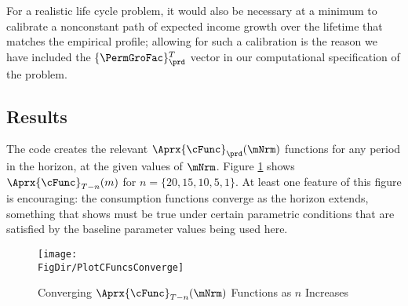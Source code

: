 \documentclass[\econtexRoot/SolvingMicroDSOPs]{subfiles}
\begin{document}
For a realistic life cycle problem, it would also be necessary at a
minimum to calibrate a nonconstant path of expected income growth over the
lifetime that matches the empirical profile; allowing for such
a calibration is the reason we have included the $\{\PermGroFac\}_{\prd}^{T}$
vector in our computational specification of the problem.

\hypertarget{results}{}
\subsection{Results}

The code creates the relevant $\Aprx{\cFunc}_{\prd}(\mNrm)$ functions for any period in the horizon, at the given values of $\mNrm$.  Figure \ref{fig:PlotCFuncsConverge} shows $\Aprx{\cFunc}_{T-n}(m)$ for $n=\{20,15,10,5,1\}$.  At least one feature of this figure is encouraging: the consumption functions converge as the horizon extends, something that \cite{BufferStockTheory} shows must be true under certain parametric conditions that are satisfied by the baseline parameter values being used here.

\hypertarget{PlotCFuncsConverge}{}
\begin{figure}
  \texttt{[image: \\FigDir/PlotCFuncsConverge]}
  \caption{Converging $\Aprx{\cFunc}_{T-n}(\mNrm)$ Functions as $n$ Increases}
  \label{fig:PlotCFuncsConverge}
\end{figure}
\end{document}

